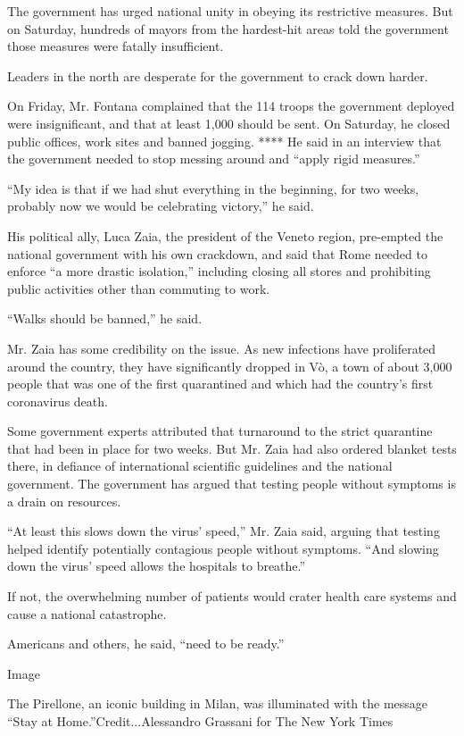 The government has urged national unity in obeying its restrictive
measures. But on Saturday, hundreds of mayors from the hardest-hit areas
told the government those measures were fatally insufficient.

Leaders in the north are desperate for the government to crack down
harder.

On Friday, Mr. Fontana complained that the 114 troops the government
deployed were insignificant, and that at least 1,000 should be sent. On
Saturday, he closed public offices, work sites and banned jogging. ****
He said in an interview that the government needed to stop messing
around and ``apply rigid measures.''

``My idea is that if we had shut everything in the beginning, for two
weeks, probably now we would be celebrating victory,'' he said.

His political ally, Luca Zaia, the president of the Veneto region,
pre-empted the national government with his own crackdown, and said that
Rome needed to enforce ``a more drastic isolation,'' including closing
all stores and prohibiting public activities other than commuting to
work.

``Walks should be banned,'' he said.

Mr. Zaia has some credibility on the issue. As new infections have
proliferated around the country, they have significantly dropped in Vò,
a town of about 3,000 people that was one of the first quarantined and
which had the country's first coronavirus death.

Some government experts attributed that turnaround to the strict
quarantine that had been in place for two weeks. But Mr. Zaia had also
ordered blanket tests there, in defiance of international scientific
guidelines and the national government. The government has argued that
testing people without symptoms is a drain on resources.

``At least this slows down the virus' speed,'' Mr. Zaia said, arguing
that testing helped identify potentially contagious people without
symptoms. ``And slowing down the virus' speed allows the hospitals to
breathe.''

If not, the overwhelming number of patients would crater health care
systems and cause a national catastrophe.

Americans and others, he said, ``need to be ready.''

Image

The Pirellone, an iconic building in Milan, was illuminated with the
message ``Stay at Home.''Credit...Alessandro Grassani for The New York
Times

